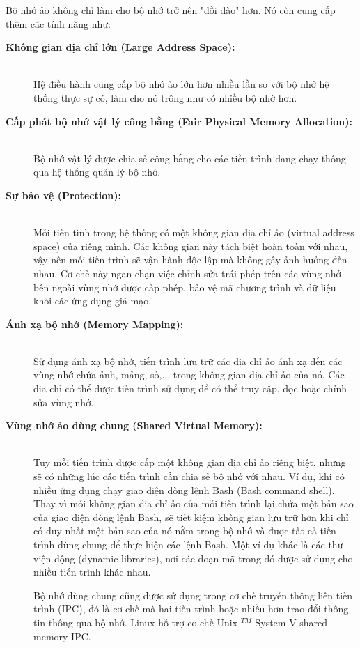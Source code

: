 \documentclass{article}
\begin{document}
Bộ nhớ ảo không chỉ làm cho bộ nhớ trở nên "dồi dào" hơn. Nó còn cung cấp thêm các tính năng như:
\begin{description}
    \item[\textbf{Không gian địa chỉ lớn (Large Address Space):}]\hfill \\ Hệ điều hành cung cấp bộ nhớ ảo lớn hơn nhiều lần so với bộ nhớ hệ thống thực sự có, làm cho nó trông như có nhiều bộ nhớ hơn.
    \item[\textbf{Cấp phát bộ nhớ vật lý công bằng (Fair Physical Memory Allocation):}]\hfill \\ Bộ nhớ vật lý được chia sẻ công bằng cho các tiền trình đang chạy thông qua hệ thống quản lý bộ nhớ.
    \item[\textbf{Sự bảo vệ (Protection):}]\hfill \\ Mỗi tiến tình trong hệ thống có một không gian địa chỉ ảo (virtual address space) của riêng mình. Các không gian này tách biệt hoàn toàn với nhau, vậy nên mỗi tiến trình sẽ vận hành độc lập mà không gây ảnh hưởng đến nhau. Cơ chế này ngăn chặn việc chỉnh sửa trái phép trên các vùng nhớ bên ngoài vùng nhớ được cấp phép, bảo vệ mã chương trình và dữ liệu khỏi các ứng dụng giả mạo.
    \item[\textbf{Ánh xạ bộ nhớ (Memory Mapping):}]\hfill \\ Sử dụng ánh xạ bộ nhớ, tiến trình lưu trữ các địa chỉ ảo ánh xạ đến các vùng nhớ chứa ảnh, mảng, số,... trong không gian địa chỉ ảo của nó. Các địa chỉ có thể được tiến trình sử dụng để có thể truy cập, đọc hoặc chỉnh sửa vùng nhớ.
    \item[\textbf{Vùng nhớ ảo dùng chung (Shared Virtual Memory):}]\hfill \\ Tuy mỗi tiến trình được cấp một không gian địa chỉ ảo riêng biệt, nhưng sẽ có những lúc các tiến trình cần chia sẻ bộ nhớ với nhau. Ví dụ, khi có nhiều ứng dụng chạy giao diện dòng lệnh Bash (Bash command shell). Thay vì mỗi không gian địa chỉ ảo của mỗi tiến trình lại chứa một bản sao của giao diện dòng lệnh Bash, sẽ tiết kiệm không gian lưu trữ hơn khi chỉ có duy nhất một bản sao của nó nằm trong bộ nhớ và được tất cả tiến trình dùng chung để thực hiện các lệnh Bash. Một ví dụ khác là các thư viện động (dynamic libraries), nơi các đoạn mã trong đó được sử dụng cho nhiều tiến trình khác nhau.
    
    Bộ nhớ dùng chung cũng được sử dụng trong cơ chế truyền thông liên tiến trình (IPC), đó là cơ chế mà hai tiến trình hoặc nhiều hơn trao đổi thông tin thông qua bộ nhớ. Linux hỗ trợ cơ chế Unix $^{TM}$ System V shared memory IPC.
\end{description}
\end{document}
